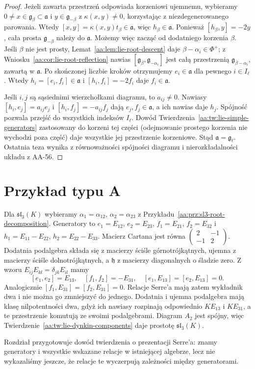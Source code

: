 \begin{proof}
Jeżeli zawarta przestrzeń odpowiada korzeniowi ujemnemu, wybieramy $0\ne x\in\mathfrak g_\beta\subset\mathfrak a$ i $y\in\mathfrak g_{-\beta}$ z $\kappa(x,y)\ne0$, korzystając z niezdegenerowanego parowania. Wtedy $[x,y]=\kappa(x,y)t_\beta\in\mathfrak a$, więc $h_\beta\in\mathfrak a$. Ponieważ $[h_\beta,y]=-2y$, cała prosta $\mathfrak g_{-\beta}$ należy do $\mathfrak a$. Możemy więc zacząć od dodatniego korzenia $\beta$. Jeśli $\beta$ nie jest prosty, Lemat~\ref{aa:lem:lie-root-descent} daje $\beta-\alpha_i\in\Phi^+$; z Wniosku~\ref{aa:cor:lie-root-reflection} nawias $[\mathfrak g_\beta,\mathfrak g_{-\alpha_i}]$ jest całą przestrzenią $\mathfrak g_{\beta-\alpha_i}$, zawartą w $\mathfrak a$. Po skończonej liczbie kroków otrzymujemy $e_i\in\mathfrak a$ dla pewnego $i\in I_\ell$. Wtedy $h_i=[e_i,f_i]\in\mathfrak a$ i $[h_i,f_i]=-2f_i$ daje $f_i\in\mathfrak a$.

Jeśli $i,j$ są sąsiednimi wierzchołkami diagramu, to $a_{ij}\ne0$. Nawiasy $[h_i,e_j]=a_{ij}e_j$ i $[h_i,f_j]=-a_{ij}f_j$ dają $e_j,f_j\in\mathfrak a$, a ich nawias daje $h_j$. Spójność pozwala przejść do wszystkich indeksów $I_\ell$. Dowód Twierdzenia~\ref{aa:tw:lie-simple-generators} zastosowany do korzeni tej części (odejmowanie prostego korzenia nie wychodzi poza część) daje wszystkie jej przestrzenie korzeniowe. Stąd $\mathfrak a=\mathfrak g_\ell$. Ostatnia teza wynika z równoważności spójności diagramu i nierozkładalności układu z AA-56.
\end{proof}

\section{Przykład typu A}
\begin{przyklad}
\label{aa:prz:lie-serre-sl3}
Dla $\mathfrak{sl}_3(K)$ wybieramy $\alpha_1=\alpha_{12}$, $\alpha_2=\alpha_{23}$ z Przykładu~\ref{aa:prz:sl3-root-decomposition}. Generatory to
$e_1=E_{12}$, $e_2=E_{23}$, $f_1=E_{21}$, $f_2=E_{32}$ i $h_1=E_{11}-E_{22}$, $h_2=E_{22}-E_{33}$. Macierz Cartana jest równa
$\left(\begin{smallmatrix}2&-1\\-1&2\end{smallmatrix}\right)$.
Dodatnia podalgebra składa się z macierzy ściśle górnotrójkątnych, ujemna z macierzy ściśle dolnotrójkątnych, a $\mathfrak h$ z macierzy diagonalnych o śladzie zero. Z wzoru $E_{ij}E_{kl}=\delta_{jk}E_{il}$ mamy
\[
 [e_1,e_2]=E_{13},\quad [f_1,f_2]=-E_{31},\quad
 [e_1,E_{13}]=[e_2,E_{13}]=0.
\]
Analogicznie $[f_1,E_{31}]=[f_2,E_{31}]=0$. Relacje Serre'a mają zatem wykładnik dwa i nie można go zmniejszyć do jednego. Dodatnia i ujemna podalgebra mają klasę nilpotentności dwa, gdyż ich nawiasy rozpinają odpowiednio $KE_{13}$ i $KE_{31}$, a te przestrzenie komutują ze swoimi podalgebrami. Diagram $A_2$ jest spójny, więc Twierdzenie~\ref{aa:tw:lie-dynkin-components} daje prostotę $\mathfrak{sl}_3(K)$.
\end{przyklad}

Rozdział przygotowuje dowód twierdzenia o prezentacji Serre'a: znamy generatory i wszystkie wskazane relacje w istniejącej algebrze, lecz nie wykazaliśmy jeszcze, że relacje te wyczerpują zależności między generatorami.
